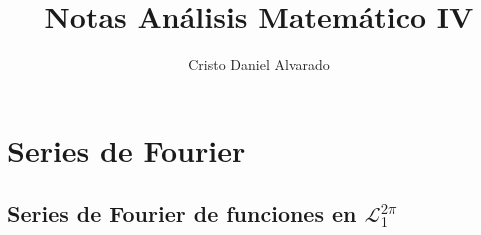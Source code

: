 \documentclass[12pt]{report}
\theoremstyle{largebreak}
\begin{document}
    \setlength{\parskip}{5pt} %
    \setlength{\parindent}{12pt} %
    \title{Notas Análisis Matemático IV}
    \author{Cristo Daniel Alvarado}
    \maketitle

    \tableofcontents %
    
    \setcounter{chapter}{2}

    \chapter{Series de Fourier}
    
    \section{Series de Fourier de funciones en $\mathcal{L}_1^{2\pi}$}
    
\end{document}
